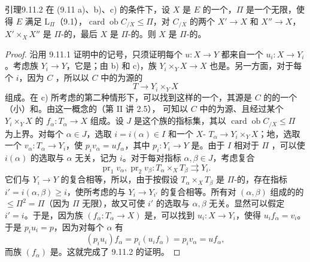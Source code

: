 \begin{SGAresult}{引理}{9.11.2}
在 (9.11 a)、b)、c) 的条件下，设 $X$ 是 $E$ 的一个，$\Pi$ 是一个无限，使得 $E$ 满足 $\mathrm L_\Pi$（9.1），$\operatorname{card}\operatorname{ob}C_{/X}\leq\Pi$，对 $C_{/X}$ 的两个 $X'\to X$ 和 $X''\to X$，$X'\times_X X''$ 是 $\Pi$-的，最后 $X$ 是 $\Pi$-的。则 $X$ 是 $\Pi$-的。
\end{SGAresult}
\begin{proof}
沿用 9.11.1 证明中的记号，只须证明每个 $u:X\to Y$ 都来自一个 $u_i:X\to Y_i$。考虑族 $Y_i\to Y$，它是；由 b) 和 c)，族 $Y_i\times_YX\to X$ 也是。另一方面，对于每个 $i$，因为 $C$ ，所以以 $C$ 中的为源的
\[
T\longrightarrow Y_i\times_YX
\]
组成。在 c) 所考虑的第二种情形下，可以找到这样的一个，其源是 $C$ 的的一个（小）和。由这一概念的（第 II 讲 2.5），
可知以 $C$ 中的为源、且经过某个 $Y_i\times_YX$ 的 $f_\alpha:T_\alpha\to X$ 组成。设 $J$ 是这个族的指标集，其以 $\operatorname{card}\operatorname{ob}C_{/X}\leq\Pi$ 为上界。对每个 $\alpha\in J$，选取 $i=i(\alpha)\in I$ 和一个 $X$- $T_\alpha\to Y_i\times_YX$；地，选取一个 $v_\alpha:T_\alpha\to Y_i$，使 $p_iv_\alpha=uf_\alpha$，其中 $p_i:Y_i\to Y$ 是。由于 $I$ 相对于 $\Pi$ ，可以使 $i(\alpha)$ 的选取与 $\alpha$ 无关，记为 $i$。对于每对指标 $\alpha,\beta\in J$，考虑复合
\[
\operatorname{pr}_1v_\alpha,\operatorname{pr}_2v_\beta:
T_\alpha\times_X T_\beta\rightrightarrows Y_i.
\]
它们与 $Y_i\to Y$ 的复合相等，所以，由于按假设 $T_\alpha\times_XT_\beta$ 是 $\Pi$-的，存在指标 $i'=i(\alpha,\beta)\geq i$，使所考虑的与 $Y_i\to Y_{i'}$ 的复合相等。所有对 $(\alpha,\beta)$ 组成的的 $\leq\Pi^2=\Pi$（因为 $\Pi$ 无限），故又可使 $i'$ 的选取与 $\alpha,\beta$ 无关。显然可以假定 $i'=i$。于是，因为族 $(f_\alpha:T_\alpha\to X)$ 是，可以找到 $u_i:X\to Y_i$，使得 $u_if_\alpha=v_i$。于是 $p_iu_i=p$，因为对每个 $\alpha$ 有
\[
(p_iu_i)f_\alpha=p_i(u_if_\alpha)=p_iv_\alpha=uf_\alpha,
\]
而族 $(f_\alpha)$ 是。这就完成了 9.11.2 的证明。
\end{proof}

